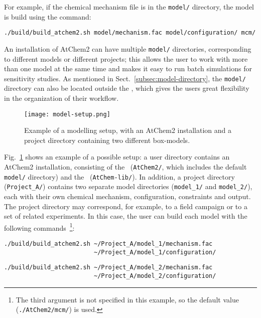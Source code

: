 For example, if the chemical mechanism file is in the \texttt{model/}
directory, the model is build using the command:

\begin{verbatim}
./build/build_atchem2.sh model/mechanism.fac model/configuration/ mcm/
\end{verbatim}

An installation of AtChem2 can have multiple \texttt{model/}
directories, corresponding to different models or different projects;
this allows the user to work with more than one model at the same time
and makes it easy to run batch simulations for sensitivity studies. As
mentioned in Sect.~\ref{subsec:model-directory}, the \texttt{model/}
directory can also be located outside the \maindir, which gives the
users great flexibility in the organization of their workflow.

\begin{figure}[htb]
  \centering
  \texttt{[image: model-setup.png]}
  \caption{Example of a modelling setup, with an AtChem2 installation
    and a project directory containing two different box-models.}
  \label{fig:setup}
\end{figure}

Fig.~\ref{fig:setup} shows an example of a possible setup: a user
directory contains an AtChem2 installation, consisting of the
\maindir\ (\texttt{AtChem2/}, which includes the default
\texttt{model/} directory) and the \depdir\ (\texttt{AtChem-lib/}). In
addition, a project directory (\texttt{Project\_A/}) contains two
separate model directories (\texttt{model\_1/} and
\texttt{model\_2/}), each with their own chemical mechanism,
configuration, constraints and output. The project directory may
correspond, for example, to a field campaign or to a set of related
experiments. In this case, the user can build each model with the
following commands~\footnote{The third argument is not specified in
  this example, so the default value (\texttt{./AtChem2/mcm/}) is
  used.}:

\begin{verbatim}
./build/build_atchem2.sh ~/Project_A/model_1/mechanism.fac
                         ~/Project_A/model_1/configuration/
\end{verbatim}

\begin{verbatim}
./build/build_atchem2.sh ~/Project_A/model_2/mechanism.fac
                         ~/Project_A/model_2/configuration/
\end{verbatim}

